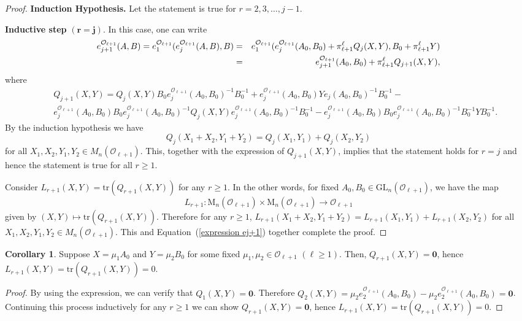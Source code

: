 \documentclass[10pt,twoside]{amsart}
\newcommand{\GL}{\mathrm{GL}}
\newcommand{\tr}{\mathrm{tr}}
\newcommand{\M}{\mathrm{M}}
\theoremstyle{definition}
\theoremstyle{definition}
\newtheorem{corollary}[theorem]{Corollary}
\begin{document}
\begin{proof}
\textbf{Induction Hypothesis.} Let the statement is true for $r= 2, 3,\ldots, j-1$.

\textbf{Inductive step} $\mathbf{(r=j)}.$ In this case, one can write 
\begin{eqnarray}{\label{expression ej+1}}
e_{j+1}^{\mathcal{O}_{\ell+1}}(A,B)= e_1^{\mathcal{O}_{\ell+1}}(e_j^{\mathcal{O}_{\ell+1}}(A,B),B)          &=& e_1^{\mathcal{O}_{\ell+1}}(e_j^{\mathcal{O}_{\ell+1}}(A_0,B_0)+\pi_{\ell+1}^{\ell} Q_j(X,Y),B_0+\pi_{\ell+1}^{\ell} Y) \\ \nonumber
 &=& e_{j+1}^{\mathcal{O}_{\ell+1}}(A_0,B_0)+\pi_{\ell+1}^{\ell} Q_{j+1}(X,Y),
\end{eqnarray}
where 
\begin{eqnarray*}
&&Q_{j+1}(X,Y)=Q_j(X,Y)B_0e_j^{\mathcal{O}_{\ell+1}}(A_0,B_0)^{-1}B_0^{-1}+e_j^{\mathcal{O}_{\ell+1}}(A_0,B_0)Ye_j(A_0,B_0)^{-1}B_0^{-1}-\\
&& e_j^{\mathcal{O}_{\ell+1}}(A_0,B_0)B_0e_j^{\mathcal{O}_{\ell+1}}(A_0,B_0)^{-1}Q_j(X,Y)e_j^{\mathcal{O}_{\ell+1}}(A_0,B_0)^{-1}B_0^{-1}-e_j^{\mathcal{O}_{\ell+1}}(A_0,B_0)B_0e_j^{\mathcal{O}_{\ell+1}}(A_0,B_0)^{-1}B_0^{-1}YB_0^{-1}.
      \end{eqnarray*}
By the induction hypothesis we have $$Q_j(X_1+X_2,Y_1+Y_2) = Q_j(X_1,Y_1) + Q_j(X_2,Y_2)$$
for all $X_1, X_2, Y_1, Y_2\in M_n(\mathcal{O}_{\ell+1})$. This, together with the expression of $ Q_{j+1}(X, Y)$, implies that the statement holds for $r=j$ and hence the statement is true for all $r\geq 1$.

Consider $L_{r+1}(X, Y) = \tr(Q_{r+1}(X, Y))$ for any $r\geq 1$. In the other words, for fixed $A_0, B_0\in \GL_n(\mathcal{O}_{\ell+1})$, we have the map 
$$L_{r+1}\colon \M_n(\mathcal{O}_{\ell+1}) \times \M_n(\mathcal{O}_{\ell+1}) \rightarrow \mathcal{O}_{\ell+1}$$ 
given by $(X,Y) \mapsto \tr(Q_{r+1}(X,Y))$. Therefore for any $r\geq 1$, $L_{r+1}(X_1+ X_2,Y_1 + Y_2) = L_{r+1}(X_1, Y_1) + L_{r+1}(X_2, Y_2)$ for all $X_1, X_2, Y_1, Y_2\in M_n(\mathcal{O}_{\ell+1})$. This and Equation~(\ref{expression ej+1}) together complete the proof.
\end{proof}

\begin{corollary}{\label{scl}}
Suppose $X= \mu_1 A_0$ and $Y=\mu_2B_0$ for some fixed $\mu_1, \mu_2\in \mathcal{O}_{\ell+1}$ $(\ell\geq 1)$. Then, $Q_{r+1}(X,Y)=\mathbf{0}$, hence $L_{r+1}(X,Y)=\tr(Q_{r+1}(X,Y))=0$.
\end{corollary}
\begin{proof}
By using the expression, we can verify that $Q_1(X, Y) = \mathbf{0}$. Therefore $Q_2(X,Y) = \mu_2e_2^{\mathcal{O}_{\ell+1}}(A_0, B_0)-\mu_2e_2^{\mathcal{O}_{\ell+1}}(A_0, B_0) = \mathbf{0}$. Continuing this process inductively for any $r\geq 1$ we can show $Q_{r+1}(X,Y)=\mathbf{0}$, hence $L_{r+1}(X,Y)=\tr(Q_{r+1}(X,Y))=0$.
\end{proof}
\end{document}
